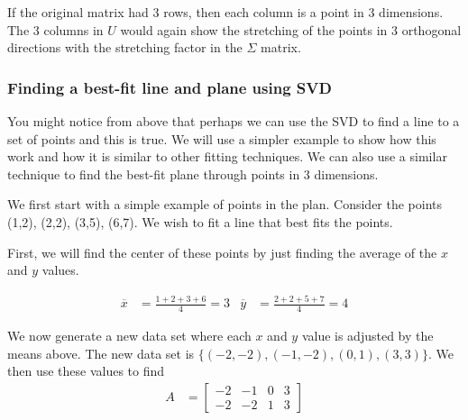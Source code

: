 If the original matrix had 3 rows, then each column is a point in 3 dimensions.  The 3 columns in $U$ would again show the stretching of the points in 3 orthogonal directions with the stretching factor in the $\Sigma$ matrix.   






\subsubsection{Finding a best-fit line and plane using SVD}

You might notice from above that perhaps we can use the SVD to find a line to a set of points and this is true.  We will use a simpler example to show how this work and how it is similar to other fitting techniques.  We can also use a similar technique to find the best-fit plane through points in 3 dimensions.  

We first start with a simple example of points in the plan.  Consider the points (1,2), (2,2), (3,5), (6,7).  We wish to fit a line that best fits the points.  


\begin{center}
\end{center}

First, we will find the center of these points by just finding the average of the $x$ and $y$ values.

\begin{align*}
\overline{x} & = \frac{1+2+3+6}{4} = 3 & \overline{y} & = \frac{2+2+5+7}{4} = 4
\end{align*}

We now generate a new data set where each $x$ and $y$ value is adjusted by the means above.  The new data set is $\{(-2,-2),(-1,-2),(0,1),(3,3)\}$.  We then use these values to find 
%
\begin{align*}
A & = \begin{bmatrix}
-2 & -1 & 0 & 3 \\
-2 & -2 & 1 & 3
\end{bmatrix}
\end{align*}

